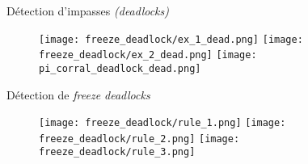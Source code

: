             \begin{frame}{Détection d'impasses \textit{(deadlocks)}}
                \begin{figure}
                    \centering
                     {
                        \texttt{[image: freeze\_deadlock/ex\_1\_dead.png]}
                    }
                     {
                        \texttt{[image: freeze\_deadlock/ex\_2\_dead.png]}
                    }
                     {
                        \texttt{[image: pi\_corral\_deadlock\_dead.png]}
                    }
                \end{figure}
            \end{frame}

            \begin{frame}{Détection de \textit{freeze deadlocks}}
                \begin{figure}
                     {
                        \texttt{[image: freeze\_deadlock/rule\_1.png]}
                    }
                     {
                        \texttt{[image: freeze\_deadlock/rule\_2.png]}
                    }
                     {
                        \texttt{[image: freeze\_deadlock/rule\_3.png]}
                    }
                \end{figure}
            \end{frame}

